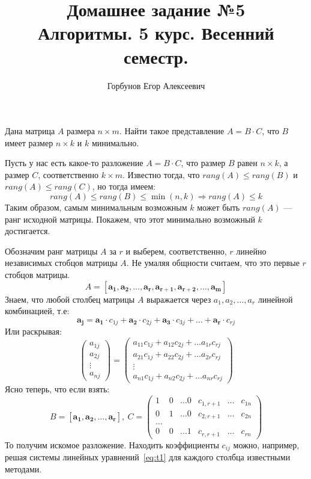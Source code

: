 
\title{Домашнее задание №5 \\ Алгоритмы. 5 курс. Весенний семестр.}
\author{Горбунов Егор Алексеевич}


\maketitle

\begin{task}[1]
Дана матрица $A$ размера $n \times m$. Найти такое представление $A = B \cdot C$, что $B$ имеет размер $n \times k$
и $k$ минимально.
\end{task}
\begin{solution} Пусть у нас есть какое-то разложение $A = B \cdot C$, что размер $B$ равен $n \times k$, а размер $C$, соответственно $k \times m$. Известно тогда, что $rang(A) \leqslant rang(B)$ и $rang(A) \leqslant rang(C)$, но тогда имеем:
\[
	rang(A) \leqslant rang(B) \leqslant \min{(n, k)} \Rightarrow rang(A) \leqslant k
\]
Таким образом, самым минимальным возможным $k$ может быть $rang(A)$ --- ранг исходной матрицы. Покажем, что этот минимально возможный $k$ достигается.

Обозначим ранг матрицы $A$ за $r$ и выберем, соответственно, $r$ линейно независимых стобцов матрицы $A$. Не умаляя общности считаем, что это первые $r$ стобцов матрицы.
\[
	A = \left[ \bm{a_1}, \bm{a_2}, \ldots, \bm{a_r}, \bm{a_{r+1}}, \bm{a_{r+2}}, ..., \bm{a_{m}} \right]
\]
Знаем, что любой столбец матрицы $A$ выражается через $a_1, a_2, \ldots, a_r$ линейной комбинацией, т.е:
\[
	\bm{a_j} = \bm{a_1} \cdot c_{1j} + \bm{a_2} \cdot c_{2j} + \bm{a_3} \cdot c_{3j} + \ldots + \bm{a_r} \cdot c_{rj}
\]
Или раскрывая:
\begin{equation}
\label{eq:t1}
	\begin{pmatrix}
		a_{1j}\\
		a_{2j}\\
		\vdots\\
		a_{nj} 
	\end{pmatrix}
	=
	\begin{pmatrix}
		a_{11}c_{1j} + a_{12}c_{2j} + \ldots a_{1r}c_{rj}\\
		a_{21}c_{1j} + a_{22}c_{2j} + \ldots a_{2r}c_{rj}\\
		\vdots\\
		a_{n1}c_{1j} + a_{n2}c_{2j} + \ldots a_{nr}c_{rj}

	\end{pmatrix}
\end{equation}
Ясно теперь, что если взять:
\[
	B = \left[ \bm{a_1}, \bm{a_2}, \ldots, \bm{a_r} \right],\ C = 
	\begin{pmatrix}
		1 & 0 & \ldots 0 & c_{1,{r + 1}} & \ldots & c_{1n} \\
		0 & 1 & \ldots 0 & c_{2,r + 1} & \ldots & c_{2n} \\
		\ldots \\
		0 & 0 & \ldots 1 & c_{r,r + 1} & \ldots & c_{rn}
	\end{pmatrix}
\]
То получим искомое разложение. Находить коэффициенты $c_{ij}$ можно, например, решая системы линейных уравнений~\ref{eq:t1} для каждого столбца известными методами.
\xqed
\end{solution}

